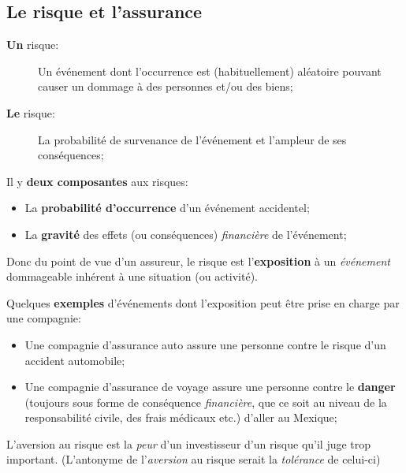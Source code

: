 \documentclass[10pt, french]{article}
\begin{document}
\begin{multicols*}{3} 
\section{Le risque et l'assurance}
\begin{definitionNOHFILL}[Risque]
\begin{description}
	\item[\textbf{Un} risque:] Un événement dont l'occurrence est (habituellement) aléatoire pouvant causer un dommage à des personnes et/ou des biens;
	\item[\textbf{Le} risque:] La probabilité de survenance de l'événement et l'ampleur de ses conséquences;
\end{description}

Il y \textbf{deux composantes} aux risques:
\begin{itemize}
	\item	La \textbf{probabilité d'occurrence} d'un événement accidentel;
	\item	La \textbf{gravité} des effets (ou conséquences) \textit{financière} de l'événement;
\end{itemize}

Donc du point de vue d'un assureur, le risque est l'\textbf{exposition} à un \textit{événement} dommageable inhérent à une situation (ou activité). 

Quelques \textbf{exemples} d'événements dont l'exposition peut être prise en charge par une compagnie:
\begin{itemize}
	\item	Une compagnie d'assurance auto assure une personne contre le risque d'un accident automobile;
	\item	Une compagnie d'assurance de voyage assure une personne contre le \textbf{danger} (toujours sous forme de conséquence \textit{financière}, que ce soit au niveau de la responsabilité civile, des frais médicaux etc.) d'aller au Mexique;
\end{itemize}
\end{definitionNOHFILL}

\begin{definitionNOHFILL}[Aversion]
L'aversion au risque est la \textit{peur} d'un investisseur d'un risque qu'il juge trop important.
(L'antonyme de l'\textit{aversion} au risque serait la \textit{tolérance} de celui-ci)


\end{definitionNOHFILL}
\end{multicols*}
\end{document}
